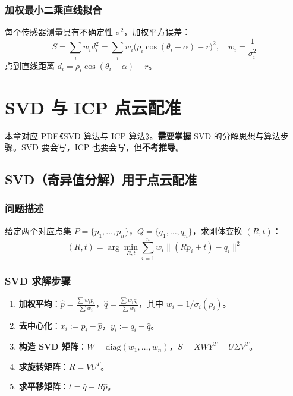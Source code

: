 \documentclass[11pt,a4paper]{article}
\begin{document}
\subsubsection*{加权最小二乘直线拟合}
每个传感器测量具有不确定性 $\sigma^2$，加权平方误差：
\[
S=\sum_i w_i d_i^2 = \sum_i w_i\bigl(\rho_i\cos(\theta_i-\alpha)-r\bigr)^2,\quad
w_i=\frac{1}{\sigma_i^2}
\]
点到直线距离 $d_i=\rho_i\cos(\theta_i-\alpha)-r$。

\section{SVD 与 ICP 点云配准}

\begin{keypoint}
本章对应 PDF\,《SVD 算法与 ICP 算法》。\textbf{需要掌握} SVD 的分解思想与算法步骤。SVD 要会写，ICP 也要会写，但\textbf{不考推导}。
\end{keypoint}

\subsection{SVD（奇异值分解）用于点云配准}

\subsubsection*{问题描述}
给定两个对应点集 $P=\{p_1,\dots,p_n\}$，$Q=\{q_1,\dots,q_n\}$，求刚体变换 $(R,t)$：
\[
(R,t)=\arg\min_{R,t}\sum_{i=1}^n w_i\bigl\|(Rp_i+t)-q_i\bigr\|^2
\]

\subsubsection*{SVD 求解步骤}
\begin{enumerate}
  \item \textbf{加权平均}：$\hat{p}=\frac{\sum w_i p_i}{\sum w_i}$，$\hat{q}=\frac{\sum w_i q_i}{\sum w_i}$，其中 $w_i=1/\sigma_i(\rho_i)$。
  \item \textbf{去中心化}：$x_i:=p_i-\hat{p}$，$y_i:=q_i-\hat{q}$。
  \item \textbf{构造 SVD 矩阵}：$W=\mathrm{diag}(w_1,\dots,w_n)$，$S=XWY^T=U\Sigma V^T$。
  \item \textbf{求旋转矩阵}：$R=VU^T$。
  \item \textbf{求平移矩阵}：$t=\hat{q}-R\hat{p}$。
\end{enumerate}
\end{document}
